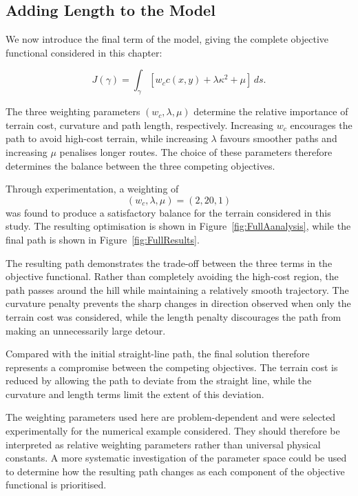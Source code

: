 \subsection{Adding Length to the Model}
\label{subsec:adding_length}

We now introduce the final term of the model, giving the complete objective functional considered in this chapter:

\[
J(\gamma)
=
\int_\gamma
\left[
w_c c(x,y)
+
\lambda\kappa^2
+
\mu
\right]\,ds.
\]

The three weighting parameters $(w_c,\lambda,\mu)$ determine the relative importance of terrain cost, curvature and path length, respectively. Increasing $w_c$ encourages the path to avoid high-cost terrain, while increasing $\lambda$ favours smoother paths and increasing $\mu$ penalises longer routes. The choice of these parameters therefore determines the balance between the three competing objectives.

Through experimentation, a weighting of
 \[
(w_c,\lambda,\mu)=(2,20,1)
\] 
was found to produce a satisfactory balance for the terrain considered in this study. The resulting optimisation is shown in Figure~\ref{fig:FullAanalysis}, while the final path is shown in Figure~\ref{fig:FullResults}.

The resulting path demonstrates the trade-off between the three terms in the objective functional. Rather than completely avoiding the high-cost region, the path passes around the hill while maintaining a relatively smooth trajectory. The curvature penalty prevents the sharp changes in direction observed when only the terrain cost was considered, while the length penalty discourages the path from making an unnecessarily large detour. 

Compared with the initial straight-line path, the final solution therefore represents a compromise between the competing objectives. The terrain cost is reduced by allowing the path to deviate from the straight line, while the curvature and length terms limit the extent of this deviation.

The weighting parameters used here are problem-dependent and were selected experimentally for the numerical example considered. They should therefore be interpreted as relative weighting parameters rather than universal physical constants. A more systematic investigation of the parameter space could be used to determine how the resulting path changes as each component of the objective functional is prioritised.

